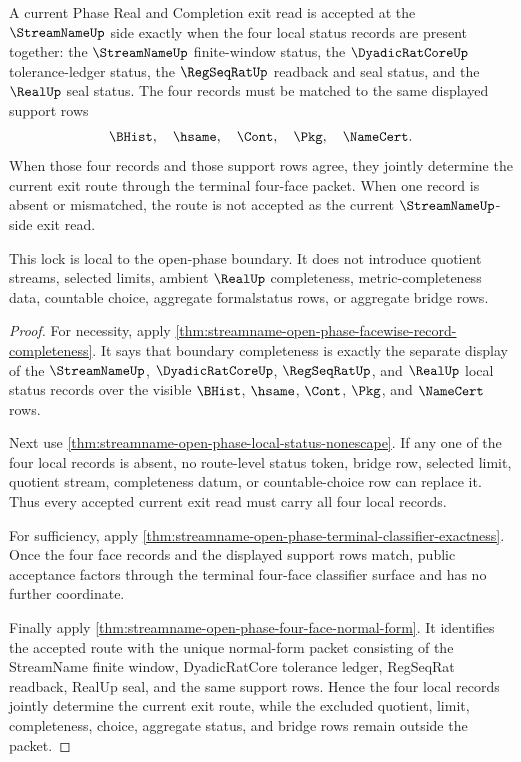 \begin{theorem}
\label{thm:streamname-open-phase-local-status-exit-lock}
A current Phase Real and Completion exit read is accepted at the $\StreamNameUp$ side exactly when the four local status records are present together: the $\StreamNameUp$ finite-window status, the $\DyadicRatCoreUp$ tolerance-ledger status, the $\RegSeqRatUp$ readback and seal status, and the $\RealUp$ seal status. The four records must be matched to the same displayed support rows
$$
\BHist,\quad \hsame,\quad \Cont,\quad \Pkg,\quad \NameCert.
$$
When those four records and those support rows agree, they jointly determine the current exit route through the terminal four-face packet. When one record is absent or mismatched, the route is not accepted as the current $\StreamNameUp$-side exit read.

This lock is local to the open-phase boundary. It does not introduce quotient streams, selected limits, ambient $\RealUp$ completeness, metric-completeness data, countable choice, aggregate formalstatus rows, or aggregate bridge rows.
\end{theorem}
\begin{proof}
For necessity, apply \autoref{thm:streamname-open-phase-facewise-record-completeness}. It says that boundary completeness is exactly the separate display of the $\StreamNameUp$, $\DyadicRatCoreUp$, $\RegSeqRatUp$, and $\RealUp$ local status records over the visible $\BHist$, $\hsame$, $\Cont$, $\Pkg$, and $\NameCert$ rows.

Next use \autoref{thm:streamname-open-phase-local-status-nonescape}. If any one of the four local records is absent, no route-level status token, bridge row, selected limit, quotient stream, completeness datum, or countable-choice row can replace it. Thus every accepted current exit read must carry all four local records.

For sufficiency, apply \autoref{thm:streamname-open-phase-terminal-classifier-exactness}. Once the four face records and the displayed support rows match, public acceptance factors through the terminal four-face classifier surface and has no further coordinate.

Finally apply \autoref{thm:streamname-open-phase-four-face-normal-form}. It identifies the accepted route with the unique normal-form packet consisting of the StreamName finite window, DyadicRatCore tolerance ledger, RegSeqRat readback, RealUp seal, and the same support rows. Hence the four local records jointly determine the current exit route, while the excluded quotient, limit, completeness, choice, aggregate status, and bridge rows remain outside the packet.
\end{proof}

